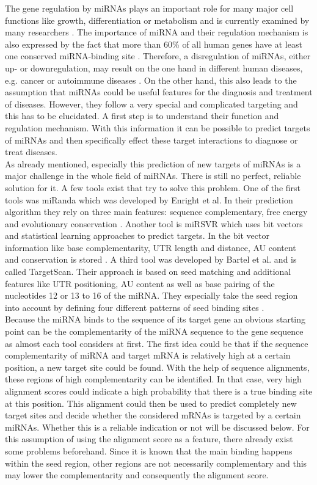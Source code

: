 \documentclass[11pt,  a4paper]{report}
\begin{document}
The gene regulation by miRNAs plays an important role for many major cell functions like growth, differentiation or metabolism and is currently examined by many researchers \cite{Ardekani}. The importance of miRNA and their regulation mechanism is also expressed by the fact that more than 60\% of all human genes have at least one conserved miRNA-binding site \cite{Friedman}. Therefore, a disregulation of miRNAs, either up- or downregulation, may result on the one hand in different human diseases, e.g. cancer or autoimmune diseases \cite{Ardekani}. On the other hand, this also leads to the assumption that miRNAs could be useful features for the diagnosis and treatment of diseases. However, they follow a very special and complicated targeting and this has to be elucidated. A first step is to understand their function and regulation mechanism. With this information it can be possible to predict targets of miRNAs and then specifically effect these target interactions to diagnose or treat diseases. \\
As already mentioned, especially this prediction of new targets of miRNAs is a major challenge in the whole field of miRNAs. There is still no perfect, reliable solution for it. A few tools exist that try to solve this problem. One of the first tools was miRanda which was developed by Enright et al. In their prediction algorithm they rely on three main features: sequence complementary, free energy and evolutionary conservation \cite{Enright}. Another tool is miRSVR which uses bit vectors and statistical learning approaches to predict targets. In the bit vector information like base complementarity, UTR length and distance, AU content and conservation is stored \cite{Betel}. A third tool was developed by Bartel et al. and is called TargetScan. Their approach is based on seed matching and additional features like UTR positioning, AU content as well as base pairing of the nucleotides 12 or 13 to 16 of the miRNA. They especially take the seed region into account by defining four different patterns of seed binding sites \cite{Lewis}.\\

Because the miRNA binds to the sequence of its target gene an obvious starting point can be the complementarity of the miRNA sequence to the gene sequence as almost each tool considers at first. The first idea could be that if the sequence complementarity of miRNA and target mRNA is relatively high at a certain position, a new target site could be found. With the help of sequence alignments, these regions of high complementarity can be identified. In that case, very high alignment scores could indicate a high probability that there is a true binding site at this position. This alignment could then be used to predict completely new target sites and decide whether the considered mRNAs is targeted by a certain miRNAs. Whether this is a reliable indication or not will be discussed below. For this assumption of using the alignment score as a feature, there already exist some problems beforehand. Since it is known that the main binding happens within the seed region, other regions are not necessarily complementary and this may lower the complementarity and consequently the alignment score. \\
\end{document}
